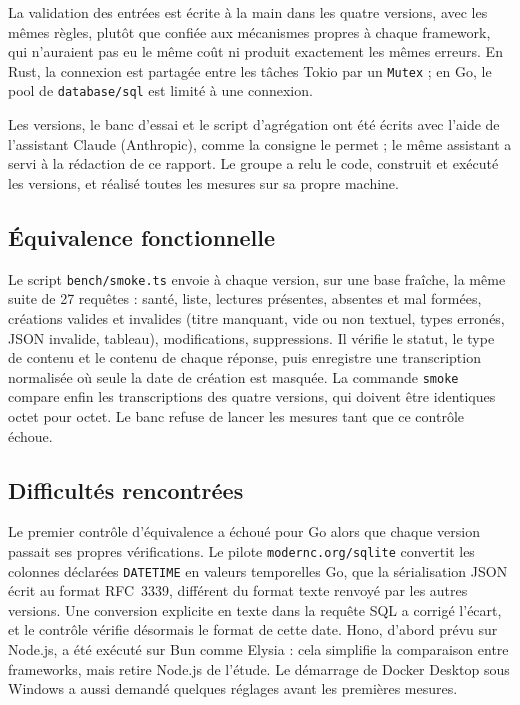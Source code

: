 \documentclass[conference,a4paper]{IEEEtran}
\begin{document}
La validation des entrées est écrite à la main dans les quatre versions,
avec les mêmes règles, plutôt que confiée aux mécanismes propres à
chaque framework, qui n'auraient pas eu le même coût ni produit
exactement les mêmes erreurs. En Rust, la connexion est partagée entre
les tâches Tokio par un \texttt{Mutex} ; en Go, le pool de
\texttt{database/sql} est limité à une connexion.

Les versions, le banc d'essai et le script d'agrégation ont été écrits
avec l'aide de l'assistant Claude (Anthropic), comme la consigne le
permet ; le même assistant a servi à la rédaction de ce rapport. Le
groupe a relu le code, construit et exécuté les versions, et réalisé
toutes les mesures sur sa propre machine.

\subsection{Équivalence fonctionnelle}
Le script \texttt{bench/smoke.ts} envoie à chaque version, sur une base
fraîche, la même suite de 27 requêtes : santé, liste, lectures
présentes, absentes et mal formées, créations valides et invalides (titre
manquant, vide ou non textuel, types erronés, JSON invalide, tableau),
modifications, suppressions. Il vérifie le statut, le type de contenu et
le contenu de chaque réponse, puis enregistre une transcription
normalisée où seule la date de création est masquée. La commande
\texttt{smoke} compare enfin les transcriptions des quatre versions,
qui doivent être identiques octet pour octet. Le banc refuse de lancer
les mesures tant que ce contrôle échoue.

\subsection{Difficultés rencontrées}
Le premier contrôle d'équivalence a échoué pour Go alors que chaque
version passait ses propres vérifications. Le pilote
\texttt{modernc.org/sqlite} convertit les colonnes déclarées
\texttt{DATETIME} en valeurs temporelles Go, que la sérialisation JSON
écrit au format RFC~3339, différent du format texte renvoyé par les
autres versions. Une conversion explicite en texte dans la requête SQL a
corrigé l'écart, et le contrôle vérifie désormais le format de cette
date. Hono, d'abord prévu sur Node.js, a été exécuté sur Bun comme
Elysia : cela simplifie la comparaison entre frameworks, mais retire
Node.js de l'étude. Le démarrage de Docker Desktop sous Windows a aussi
demandé quelques réglages avant les premières mesures.
\end{document}
